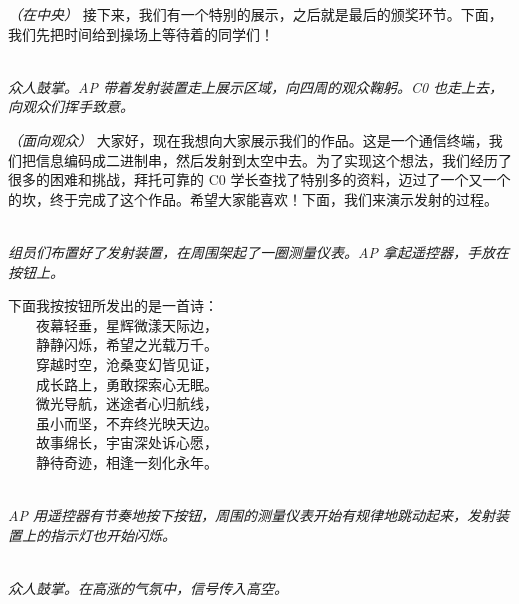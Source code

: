 \documentclass[10pt, a5paper, oneside]{memoir}
\newcommand{\stage}[1]{%
    \\[0.4\baselineskip] \textit{#1}%
}
\newcommand{\dialog}[2][旁白]{%
    \item[#1] #2%
}
\newcommand*{\direction}[1]{\textit{（#1）}}
\begin{document}
{{        \dialog[主持人]{
            \direction{在中央} 接下来，我们有一个特别的展示，之后就是最后的颁奖环节。下面，我们先把时间给到操场上等待着的同学们！
        }
        \stage{
            众人鼓掌。AP 带着发射装置走上展示区域，向四周的观众鞠躬。C0 也走上去，向观众们挥手致意。
        }
        \dialog[AP]{
            \direction{面向观众} 大家好，现在我想向大家展示我们的作品。这是一个通信终端，我们把信息编码成二进制串，然后发射到太空中去。为了实现这个想法，我们经历了很多的困难和挑战，拜托可靠的 C0 学长查找了特别多的资料，迈过了一个又一个的坎，终于完成了这个作品。希望大家能喜欢！下面，我们来演示发射的过程。
        }
        \stage{
            组员们布置好了发射装置，在周围架起了一圈测量仪表。AP 拿起遥控器，手放在按钮上。
        }
        \dialog[AP]{
            下面我按按钮所发出的是一首诗：\\[0.5em]
            {
            　　夜幕轻垂，星辉微漾天际边，\\
            　　静静闪烁，希望之光载万千。\\
            　　穿越时空，沧桑变幻皆见证，\\
            　　成长路上，勇敢探索心无眠。\\[0.5em]
            　　微光导航，迷途者心归航线，\\
            　　虽小而坚，不弃终光映天边。\\
            　　故事绵长，宇宙深处诉心愿，\\
            　　静待奇迹，相逢一刻化永年。
            }
        }
        \stage{
            AP 用遥控器有节奏地按下按钮，周围的测量仪表开始有规律地跳动起来，发射装置上的指示灯也开始闪烁。
        }
        \stage{
            众人鼓掌。在高涨的气氛中，信号传入高空。
        }
    }
}
\end{document}
